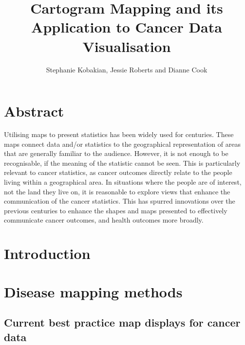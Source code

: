\documentclass[11pt,]{article}
\title{Cartogram Mapping and its Application to Cancer Data Visualisation}
\author{Stephanie Kobakian, Jessie Roberts and Dianne Cook}
\date{}
\begin{document}
\maketitle

{
\setcounter{tocdepth}{2}
\tableofcontents
}
\section*{Abstract}

Utilising maps to present statistics has been widely used for centuries.
These maps connect data and/or statistics to the geographical
representation of areas that are generally familiar to the audience.
However, it is not enough to be recognisable, if the meaning of the
statistic cannot be seen. This is particularly relevant to cancer
statistics, as cancer outcomes directly relate to the people living
within a geographical area. In situations where the people are of
interest, not the land they live on, it is reasonable to explore views
that enhance the communication of the cancer statistics. This has
spurred innovations over the previous centuries to enhance the shapes
and maps presented to effectively communicate cancer outcomes, and
health outcomes more broadly.

\hypertarget{introduction}{%
\section{Introduction}\label{introduction}}

\hypertarget{disease-mapping-methods}{%
\section{Disease mapping methods}\label{disease-mapping-methods}}

\hypertarget{current-best-practice-map-displays-for-cancer-data}{%
\subsection{Current best practice map displays for cancer
data}\label{current-best-practice-map-displays-for-cancer-data}}
\end{document}
